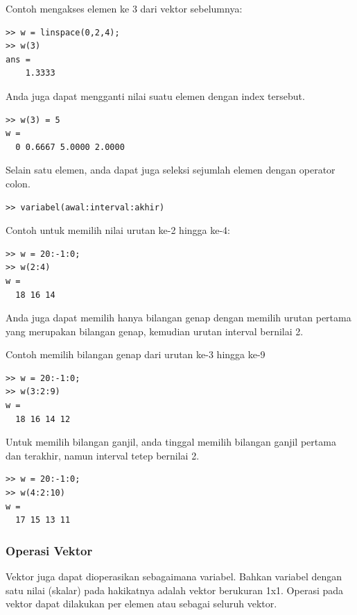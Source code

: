\documentclass[12pt]{book}
\begin{document}
	Contoh mengakses elemen ke 3 dari vektor sebelumnya:
	\begin{verbatim}
>> w = linspace(0,2,4);
>> w(3)
ans =
    1.3333
	\end{verbatim}

	Anda juga dapat mengganti nilai suatu elemen dengan index tersebut.
	\begin{verbatim}
>> w(3) = 5
w =
  0 0.6667 5.0000 2.0000
	\end{verbatim}

	Selain satu elemen, anda dapat juga seleksi sejumlah elemen dengan operator colon.
	\begin{verbatim}
>> variabel(awal:interval:akhir)
	\end{verbatim}

	Contoh untuk memilih nilai urutan ke-2 hingga ke-4:
	\begin{verbatim}
>> w = 20:-1:0;
>> w(2:4)
w =
  18 16 14
	\end{verbatim}

	Anda juga dapat memilih hanya bilangan genap dengan memilih urutan pertama yang merupakan bilangan genap,
	kemudian urutan interval bernilai 2.

	Contoh memilih bilangan genap dari urutan ke-3 hingga ke-9
	\begin{verbatim}
>> w = 20:-1:0;
>> w(3:2:9)
w =
  18 16 14 12
	\end{verbatim}

	Untuk memilih bilangan ganjil, anda tinggal memilih bilangan ganjil pertama dan terakhir, namun interval tetep bernilai 2.
	\begin{verbatim}
>> w = 20:-1:0;
>> w(4:2:10)
w =
  17 15 13 11
	\end{verbatim}

	\newpage
	\subsubsection{Operasi Vektor}

	Vektor juga dapat dioperasikan sebagaimana variabel.
	Bahkan variabel dengan satu nilai (skalar) pada hakikatnya adalah vektor berukuran 1x1.
	Operasi pada vektor dapat dilakukan per elemen atau sebagai seluruh vektor.
\end{document}
